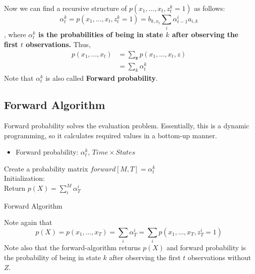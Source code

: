 Now we can find a recursive structure of $p(x_1,\dots,x_{t},z_{t}^k=1)$ as follows:
$$\alpha_t^k = p(x_1,\dots,x_{t},z_{t}^k=1) = b_{k,x_t}\sum_i \alpha_{t-1}^ia_{i,k}$$
, where \textbf{$\alpha_t^k$ is the probabilities of being in state $k$ after observing the first $t$ observations.} Thus, 
\begin{align*}
	p(x_1,\dots,x_{t}) & = \sum_{\mathbf{z}} p(x_1,\dots,x_{t},z)\\
	& = \sum_{k} \alpha_t^k
\end{align*}
Note that $\alpha_t^k$ is also called \textbf{Forward probability}.

\subsection{Forward Algorithm}
Forward probability solves the evaluation problem. Essentially, this is a dynamic programming, so it calculates required values in a bottom-up manner. 
\begin{itemize}
	\item Forward probability: $\alpha_t^k$, $Time\times States$
\end{itemize}
\begin{algorithm}
	Create a probability matrix $forward[M,T] = \alpha_t^k$\\
	Initialization: \\
	Return $p(X) = \sum_i^M \alpha_T^i$
	\caption{Forward Algorithm}
	\label{algo:forward_algorithm}
\end{algorithm}
Note again that 
$$p(X) = p(x_1,...,x_T) =\sum_i\alpha_T^i = \sum_i p(x_1,...,x_T, z_T^i=1)$$
Note also that the forward-algorithm returns $p(X)$ and forward probability is the probability of being in state $k$ after observing the first $t$ observations without $Z$. 

